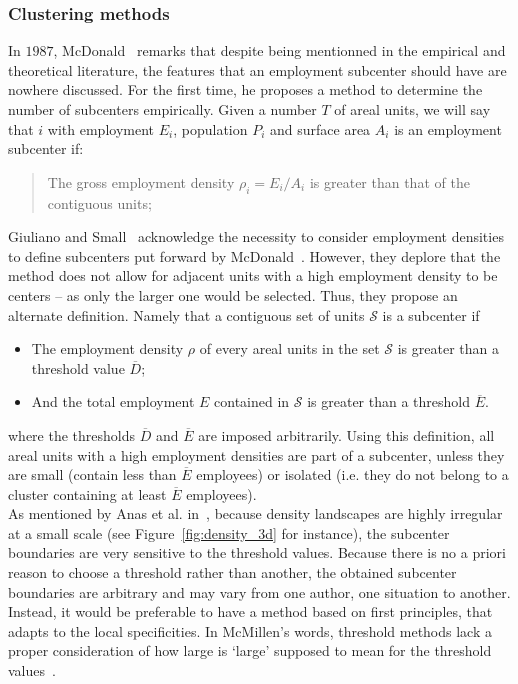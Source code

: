 \subsubsection{Clustering methods}
\label{ssub:clustering_methods}


In $1987$, McDonald~\cite{McDonald:1987} remarks that despite being mentionned
in the empirical and theoretical literature, the features that an employment
subcenter should have are nowhere discussed. For the first time, he proposes a method to
determine the number of subcenters empirically. Given
a number $T$ of areal units, we will say that $i$ with employment $E_i$,
population $P_i$ and surface area $A_i$ is an employment subcenter if:

\begin{quote}
    The gross employment density $\rho_i = E_i/A_i$ is greater than that of the
contiguous units; 
\end{quote}

Giuliano and Small~\cite{Giuliano:1991} acknowledge the necessity to
consider employment densities to define subcenters put forward by
McDonald~\cite{McDonald:1987}. However, they deplore that the method does not
allow for adjacent units with a high employment density to be centers -- as only
the larger one would be selected. Thus, they propose an alternate definition.
Namely that a contiguous set of units $\mathcal{S}$ is a subcenter if 

\begin{itemize}
    \item The employment density $\rho$ of every areal units in the set $\mathcal{S}$ is greater than
        a threshold value  $\overline{D}$;
    \item And the total employment $E$ contained in $\mathcal{S}$ is greater than a threshold
        $\overline{E}$.
\end{itemize}

where the thresholds $\overline{D}$ and $\overline{E}$ are imposed arbitrarily.
Using this definition, all areal units with a high employment densities are part
of a subcenter, unless they are small (contain less than $\overline{E}$
employees) or isolated (i.e. they do not belong to a cluster containing at
least $\overline{E}$ employees).\\


As mentioned by Anas et al. in~\cite{Anas:1998}, because density landscapes are highly
irregular at a small scale (see Figure~\ref{fig:density_3d} for instance), the
subcenter boundaries are very sensitive to the threshold values. Because there
is no a priori reason to choose a threshold rather than another, the obtained
subcenter boundaries are arbitrary and may vary from one author, one situation
to another. Instead, it would be preferable to have a method based on first
principles, that adapts to the local specificities.  In McMillen's words,
threshold methods lack a proper consideration of how large is `large' supposed
to mean for the threshold values~\cite{McMillen:2003}. 

